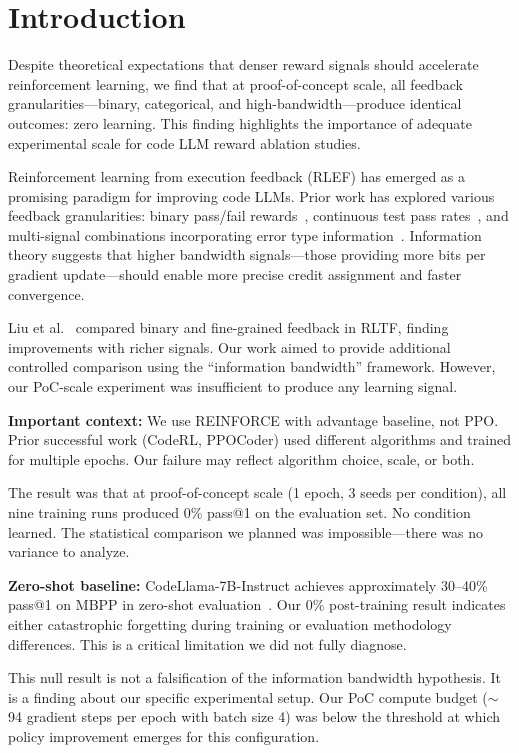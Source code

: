 \section{Introduction}
\label{sec:introduction}

Despite theoretical expectations that denser reward signals should accelerate reinforcement learning, we find that at proof-of-concept scale, all feedback granularities---binary, categorical, and high-bandwidth---produce identical outcomes: zero learning. This finding highlights the importance of adequate experimental scale for code LLM reward ablation studies.

Reinforcement learning from execution feedback (RLEF) has emerged as a promising paradigm for improving code LLMs. Prior work has explored various feedback granularities: binary pass/fail rewards~\cite{le2022coderl}, continuous test pass rates~\cite{liu2023rltf}, and multi-signal combinations incorporating error type information~\cite{shojaee2023ppocoder}. Information theory suggests that higher bandwidth signals---those providing more bits per gradient update---should enable more precise credit assignment and faster convergence.

Liu et al.~\cite{liu2023rltf} compared binary and fine-grained feedback in RLTF, finding improvements with richer signals. Our work aimed to provide additional controlled comparison using the ``information bandwidth'' framework. However, our PoC-scale experiment was insufficient to produce any learning signal.

\textbf{Important context:} We use REINFORCE with advantage baseline, not PPO. Prior successful work (CodeRL, PPOCoder) used different algorithms and trained for multiple epochs. Our failure may reflect algorithm choice, scale, or both.

The result was that at proof-of-concept scale (1 epoch, 3 seeds per condition), all nine training runs produced 0\% pass@1 on the evaluation set. No condition learned. The statistical comparison we planned was impossible---there was no variance to analyze.

\textbf{Zero-shot baseline:} CodeLlama-7B-Instruct achieves approximately 30--40\% pass@1 on MBPP in zero-shot evaluation~\cite{roziere2023codellama}. Our 0\% post-training result indicates either catastrophic forgetting during training or evaluation methodology differences. This is a critical limitation we did not fully diagnose.

This null result is not a falsification of the information bandwidth hypothesis. It is a finding about our specific experimental setup. Our PoC compute budget ($\sim$94 gradient steps per epoch with batch size 4) was below the threshold at which policy improvement emerges for this configuration.

